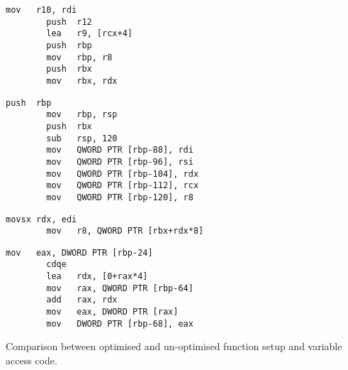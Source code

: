 

\begin{table}[!ht]
\centering
\begin{minipage}[t]{.48\textwidth}
    \begin{lstlisting}[style=cleanasm,caption={Optimised Function Entry}]
        mov   r10, rdi
        push  r12
        lea   r9, [rcx+4]
        push  rbp
        mov   rbp, r8
        push  rbx
        mov   rbx, rdx
    \end{lstlisting}
\end{minipage}
\hfill
\begin{minipage}[t]{.48\textwidth}
    \begin{lstlisting}[style=cleanasm,caption={Un-Optimised Function Entry}]
        push  rbp
        mov   rbp, rsp
        push  rbx
        sub   rsp, 120
        mov   QWORD PTR [rbp-88], rdi
        mov   QWORD PTR [rbp-96], rsi
        mov   QWORD PTR [rbp-104], rdx
        mov   QWORD PTR [rbp-112], rcx
        mov   QWORD PTR [rbp-120], r8
    \end{lstlisting}
\end{minipage}

\vspace{0.5em} 

\begin{minipage}[t]{.48\textwidth}
    \begin{lstlisting}[style=cleanasm,caption={Optimised Variable Access}]
        movsx rdx, edi
        mov   r8, QWORD PTR [rbx+rdx*8]
    \end{lstlisting}
\end{minipage}
\hfill
\begin{minipage}[t]{.48\textwidth}
    \begin{lstlisting}[style=cleanasm,caption={Un-Optimised Variable Access}]
        mov   eax, DWORD PTR [rbp-24]
        cdqe
        lea   rdx, [0+rax*4]
        mov   rax, QWORD PTR [rbp-64]
        add   rax, rdx
        mov   eax, DWORD PTR [rax]
        mov   DWORD PTR [rbp-68], eax
    \end{lstlisting}
\end{minipage}

\caption{Comparison between optimised and un-optimised function setup and variable access code.}
\label{tab:asm_opt_comparison}
\end{table}